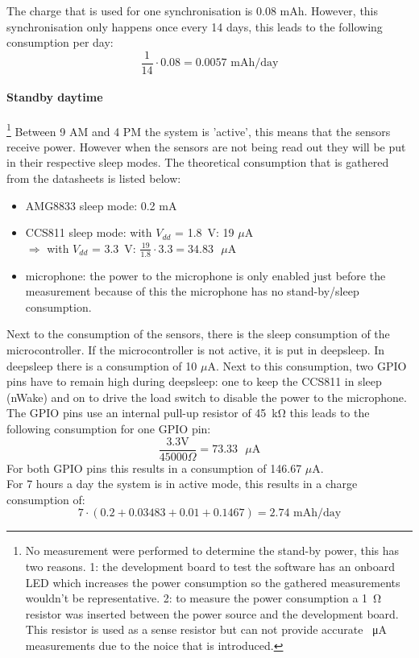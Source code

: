 \documentclass[11pt,a4paper]{article}
\begin{document}
The charge that is used for one synchronisation is 0.08 mAh. However, this synchronisation only happens once every 14 days, this leads to the following consumption per day:
\begin{equation}
	\frac{1}{14} \cdot 0.08 = 0.0057 \text{ mAh/day}
\end{equation}

\paragraph{Standby daytime}\footnote{No measurement were performed to determine the stand-by power, this has two reasons. 1: the development board to test the software has an onboard LED which increases the power consumption so the gathered measurements wouldn't be representative. 2: to measure the power consumption a \SI{1}{\ohm} resistor was inserted between the power source and the development board. This resistor is used as a sense resistor but can not provide accurate \SI{}{\micro\ampere} measurements due to the noice that is introduced. }
Between 9 AM and 4 PM the system is 'active', this means that the sensors receive power. However when the sensors are not being read out they will be put in their respective sleep modes. The theoretical consumption that is gathered from the datasheets is listed below:
\begin{itemize}
	\item AMG8833 sleep mode: 0.2 mA
	\item CCS811 sleep mode: with $V_{dd}$ = \SI{1.8}{\volt}: 19 $\mu$A \\$\Rightarrow$ with $V_{dd}$ = \SI{3.3}{\volt}: $\frac{19}{1.8}\cdot 3.3 = 34.83 \text{ }\mu\text{A}$
	\item microphone: the power to the microphone is only enabled just before the measurement because of this the microphone has no stand-by/sleep consumption. 
\end{itemize}
Next to the consumption of the sensors, there is the sleep consumption of the microcontroller. If the microcontroller is not active, it is put in deepsleep. In deepsleep there is a consumption of 10 $\mu$A. Next to this consumption, two GPIO pins have to remain high during deepsleep: one to keep the CCS811 in sleep (nWake) and on to drive the load switch to disable the power to the microphone. The GPIO pins use an internal pull-up resistor of \SI{45}{\kilo\ohm} this leads to the following consumption for one GPIO pin: 
\begin{equation}
	\frac{3.3 \text{V}}{45000\Omega} = 73.33 \text{ } \mu\text{A} 
\end{equation}
For both GPIO pins this results in a consumption of 146.67 $\mu$A.
\\
For 7 hours a day the system is in active mode, this results in a charge consumption of:
\begin{equation}
	7 \cdot (0.2 + 0.03483 + 0.01 + 0.1467) = 2.74\text{ mAh/day}
\end{equation}
\end{document}
